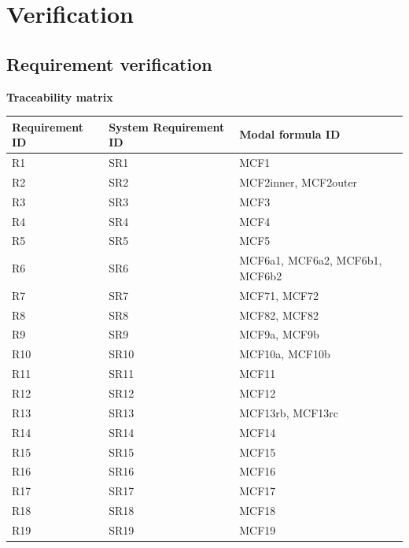 \documentclass[12pt]{report}
\begin{document}
	\chapter{Verification}

    \section{Requirement verification}

    \textbf{Traceability matrix}\\
    \begin{tabular}{| l | l | l | }
        \hline
        Requirement ID & System Requirement ID & Modal formula ID \\ \hline
        R1 & SR1 & MCF1 \\ \hline
        R2 & SR2 & MCF2inner, MCF2outer \\ \hline
        R3 & SR3 & MCF3 \\ \hline
        R4 & SR4 & MCF4 \\ \hline
        R5 & SR5 & MCF5 \\ \hline
        R6 & SR6 & MCF6a1, MCF6a2, MCF6b1, MCF6b2 \\ \hline
        R7 & SR7 & MCF71, MCF72 \\ \hline
        R8 & SR8 & MCF82, MCF82 \\ \hline
        R9 & SR9 & MCF9a, MCF9b \\ \hline
        R10 & SR10 & MCF10a, MCF10b \\ \hline
        R11 & SR11 & MCF11 \\ \hline
        R12 & SR12 & MCF12 \\ \hline
        R13 & SR13 & MCF13rb, MCF13rc \\ \hline
        R14 & SR14 & MCF14 \\ \hline
        R15 & SR15 & MCF15 \\ \hline
        R16 & SR16 & MCF16 \\ \hline
        R17 & SR17 & MCF17 \\ \hline
        R18 & SR18 & MCF18 \\ \hline
        R19 & SR19 & MCF19 \\  \hline
    \end{tabular}

    \pagebreak

\end{document}
